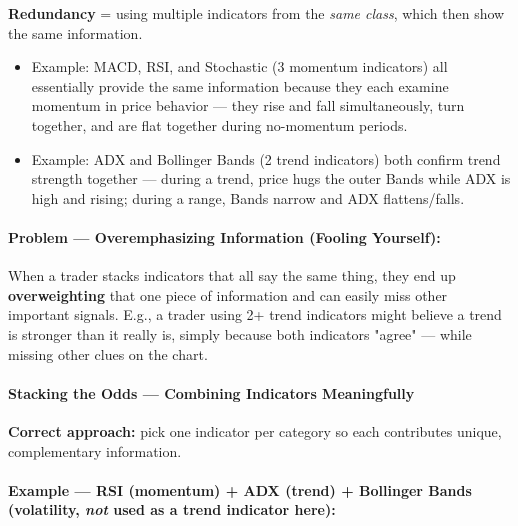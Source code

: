 \documentclass[12pt,openany]{book}
\begin{document}
\textbf{Redundancy} = using multiple indicators from the \emph{same class}, which then show the same information.

\begin{itemize}[leftmargin=*]
    \item Example: MACD, RSI, and Stochastic (3 momentum indicators) all essentially provide the same information because they each examine momentum in price behavior --- they rise and fall simultaneously, turn together, and are flat together during no-momentum periods.
    \item Example: ADX and Bollinger Bands (2 trend indicators) both confirm trend strength together --- during a trend, price hugs the outer Bands while ADX is high and rising; during a range, Bands narrow and ADX flattens/falls.
\end{itemize}

\paragraph{Problem --- Overemphasizing Information (Fooling Yourself):}
When a trader stacks indicators that all say the same thing, they end up \textbf{overweighting} that one piece of information and can easily miss other important signals. E.g., a trader using 2+ trend indicators might believe a trend is stronger than it really is, simply because both indicators "agree" --- while missing other clues on the chart.

\paragraph{Stacking the Odds --- Combining Indicators Meaningfully}

\textbf{Correct approach:} pick one indicator per category so each contributes unique, complementary information.

\paragraph{Example --- RSI (momentum) + ADX (trend) + Bollinger Bands (volatility, \emph{not} used as a trend indicator here):}
\end{document}
